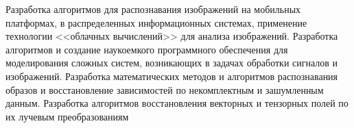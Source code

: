  \begin{center}
 {\large
Разработка алгоритмов для распознавания изображений на мобильных платформах, в распределенных информационных системах, применение технологии <<облачных вычислений>> для анализа изображений. Разработка алгоритмов и создание наукоемкого программного обеспечения для моделирования сложных систем, возникающих в задачах обработки сигналов и изображений. Разработка математических методов и алгоритмов распознавания образов и восстановление зависимостей по некомплектным и зашумленным данным. Разработка алгоритмов восстановления векторных и тензорных полей по их лучевым преобразованиям
%
 } \\[12pt]
\end{center}

